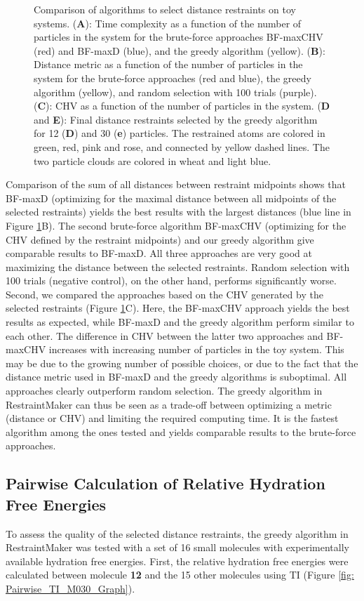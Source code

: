 \begin{figure}[h!]
\begin{subfigure}{0.45\columnwidth}
    \end{subfigure}
    \caption{Comparison of algorithms to select distance restraints on toy systems. (\textbf{A}): Time complexity as a function of the number of particles in the system for the brute-force approaches BF-maxCHV (red) and BF-maxD (blue), and the greedy algorithm (yellow). (\textbf{B}): Distance metric as a function of the number of particles in the system for the brute-force approaches (red and blue), the greedy algorithm (yellow), and random selection with 100 trials (purple). (\textbf{C}): CHV as a function of the number of particles in the system. (\textbf{D} and \textbf{E}): Final distance restraints selected by the greedy algorithm for 12 (\textbf{D}) and 30 (\textbf{e}) particles. The restrained atoms are colored in green, red, pink and rose, and connected by yellow dashed lines. The two particle clouds are colored in wheat and light blue.}
    \label{fig: ToyModels}
\end{figure}

Comparison of the sum of all distances between restraint midpoints shows that BF-maxD (optimizing for the maximal distance between all midpoints of the selected restraints) yields the best results with the largest distances (blue line in Figure \ref{fig: ToyModels}B). The second brute-force algorithm BF-maxCHV (optimizing for the CHV defined by the restraint midpoints) and our greedy algorithm give comparable results to BF-maxD. All three approaches are very good at maximizing the distance between the selected restraints. Random selection with 100 trials (negative control), on the other hand, performs significantly worse.
Second, we compared the approaches based on the CHV generated by the selected restraints (Figure \ref{fig: ToyModels}C). Here, the BF-maxCHV approach yields the best results as expected, while BF-maxD and the greedy algorithm perform similar to each other. The difference in CHV between the latter two approaches and BF-maxCHV increases with increasing number of particles in the toy system. This may be due to the growing number of possible choices, or due to the fact that the distance metric used in BF-maxD and the greedy algorithms is suboptimal. All approaches clearly outperform random selection.
%
The greedy algorithm in RestraintMaker can thus be seen as a trade-off between optimizing a metric (distance or CHV) and limiting the required computing time. It is the fastest algorithm among the ones tested and yields comparable results to the brute-force approaches. 

\subsection{Pairwise Calculation of Relative Hydration Free Energies}
To assess the quality of the selected distance restraints, the greedy algorithm in RestraintMaker was tested with a set of 16 small molecules with experimentally available hydration free energies. First, the relative hydration free energies were calculated between molecule \textbf{12} and the 15 other molecules using TI (Figure \ref{fig: Pairwise_TI_M030_Graph}). 


